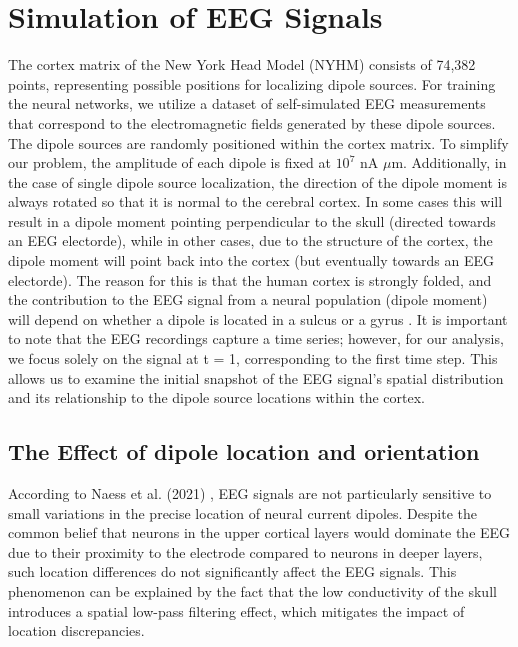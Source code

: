 \documentclass[a4paper, UKenglish, 11pt]{uiomaster}
\begin{document}
\section{Simulation of EEG Signals}
The cortex matrix of the New York Head Model (NYHM) consists of 74,382 points, representing possible positions for localizing dipole sources. For training the neural networks, we utilize a dataset of self-simulated EEG measurements that correspond to the electromagnetic fields generated by these dipole sources. The dipole sources are randomly positioned within the cortex matrix. To simplify our problem, the amplitude of each dipole is fixed at $10^7$ nA $\mu$m. Additionally, in the case of single dipole source localization, the direction of the dipole moment is always rotated so that it is normal to the cerebral cortex. In some cases this will result in a dipole moment pointing perpendicular to the skull (directed towards an EEG electorde), while in other cases, due to the structure of the cortex, the dipole moment will point back into the cortex (but eventually towards an EEG electorde). The reason for this is that the human cortex is strongly folded, and the contribution to the EEG signal from a neural population (dipole moment) will depend on whether a dipole is located in a sulcus or a gyrus \cite{naess2021biophysically}. It is important to note that the EEG recordings capture a time series; however, for our analysis, we focus solely on the signal at t = 1, corresponding to the first time step. This allows us to examine the initial snapshot of the EEG signal's spatial distribution and its relationship to the dipole source locations within the cortex.

\subsection{The Effect of dipole location and orientation}
According to Naess et al. (2021) \cite{naess2021biophysically}, EEG signals are not particularly sensitive to small variations in the precise location of neural current dipoles. Despite the common belief that neurons in the upper cortical layers would dominate the EEG due to their proximity to the electrode compared to neurons in deeper layers, such location differences do not significantly affect the EEG signals. This phenomenon can be explained by the fact that the low conductivity of the skull introduces a spatial low-pass filtering effect, which mitigates the impact of location discrepancies.
\end{document}
